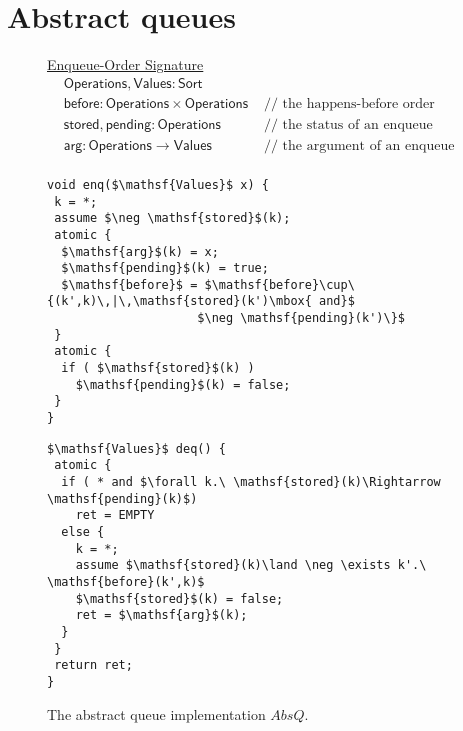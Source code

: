 \section{Abstract queues}


\begin{figure}[t]
{	\centering
	\underline{Enqueue-Order Signature}
	\begin{align*}
		& \mathsf{Operations}, \mathsf{Values} : \mathsf{Sort} \\
		& \mathsf{before} : \mathsf{Operations} \times \mathsf{Operations} &\mbox{ // the happens-before order between enqueues} \\
		& \mathsf{stored}, \mathsf{pending} : \mathsf{Operations} &\mbox{ // the status of an enqueue} \\
		& \mathsf{arg} : \mathsf{Operations} \rightarrow \mathsf{Values} &\mbox{ // the argument of an enqueue} \\
	\end{align*}
}

\begin{minipage}[t]{6cm}
\begin{lstlisting}
void enq($\mathsf{Values}$ x) {
 k = *; 
 assume $\neg \mathsf{stored}$(k);
 atomic {
  $\mathsf{arg}$(k) = x;
  $\mathsf{pending}$(k) = true;
  $\mathsf{before}$ = $\mathsf{before}\cup\{(k',k)\,|\,\mathsf{stored}(k')\mbox{ and}$
                     $\neg \mathsf{pending}(k')\}$  
 }
 atomic {
  if ( $\mathsf{stored}$(k) )
    $\mathsf{pending}$(k) = false;
 }
}
\end{lstlisting}
\end{minipage}
\begin{minipage}[t]{5cm}
\begin{lstlisting}
$\mathsf{Values}$ deq() {
 atomic {
  if ( * and $\forall k.\ \mathsf{stored}(k)\Rightarrow \mathsf{pending}(k)$)
    ret = EMPTY
  else {
    k = *;
    assume $\mathsf{stored}(k)\land \neg \exists k'.\ \mathsf{before}(k',k)$
    $\mathsf{stored}$(k) = false;
    ret = $\mathsf{arg}$(k);
  }
 }
 return ret;
}
\end{lstlisting}
\end{minipage}

	\caption{The abstract queue implementation $AbsQ$.}
	\label{fig:signatures}
\end{figure}
